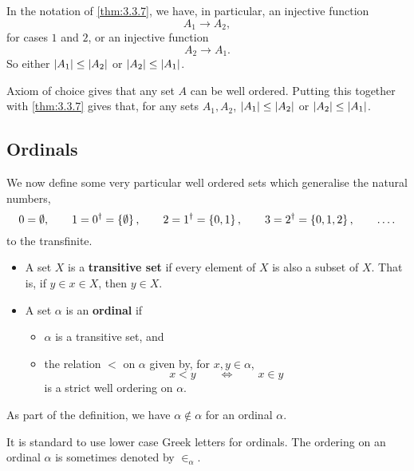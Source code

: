
\begin{remark*}
In the notation of \ref{thm:3.3.7}, we have, in particular, an injective function
$$ A_1 \to A_2, $$
for cases $ 1 $ and $ 2 $, or an injective function
$$ A_2 \to A_1. $$
So either $ \left\lvert A_1 \right\rvert \le \left\lvert A_2 \right\rvert $ or $ \left\lvert A_2 \right\rvert \le \left\lvert A_1 \right\rvert $.
\end{remark*}

Axiom of choice gives that any set $ A $ can be well ordered. Putting this together with \ref{thm:3.3.7} gives that, for any sets $ A_1, A_2 $, $ \left\lvert A_1 \right\rvert \le \left\lvert A_2 \right\rvert $ or $ \left\lvert A_2 \right\rvert \le \left\lvert A_1 \right\rvert $.

\pagebreak

\subsection{Ordinals}

We now define some very particular well ordered sets which generalise the natural numbers,
$$ 0 = \emptyset, \qquad 1 = 0^\dagger = \left\{ \emptyset \right\}, \qquad 2 = 1^\dagger = \left\{ 0, 1 \right\}, \qquad 3 = 2^\dagger = \left\{ 0, 1, 2 \right\}, \qquad \dots. $$
to the transfinite.

\begin{definition}
\hfill
\begin{itemize}
\item A set $ X $ is a \textbf{transitive set} if every element of $ X $ is also a subset of $ X $. That is, if $ y \in x \in X $, then $ y \in X $.
\item A set $ \alpha $ is an \textbf{ordinal} if
\begin{itemize}
\item $ \alpha $ is a transitive set, and
\item the relation $ < $ on $ \alpha $ given by, for $ x, y \in \alpha $,
$$ x < y \qquad \iff \qquad x \in y $$
is a strict well ordering on $ \alpha $.
\end{itemize}
\end{itemize}
\end{definition}

\begin{note*}
As part of the definition, we have $ \alpha \notin \alpha $ for an ordinal $ \alpha $.
\end{note*}

It is standard to use lower case Greek letters for ordinals. The ordering on an ordinal $ \alpha $ is sometimes denoted by $ \in_\alpha $.


